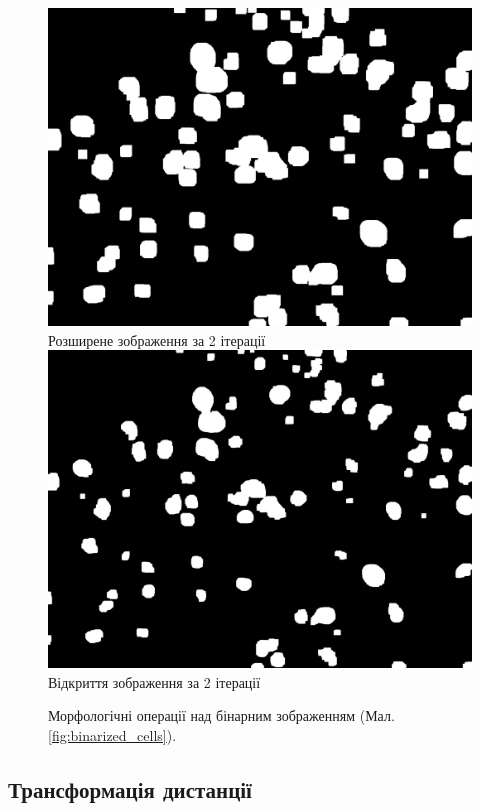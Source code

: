 \begin{figure}[b!]
	\centering	
	\includegraphics[width=0.95\linewidth]{Figures/Chapter2/3a.png}
	Розширене зображення за 2 ітерації
	\endminipage\hfill
	\centering	
	\includegraphics[width=0.95\linewidth]{Figures/Chapter2/3b.png}
	Відкриття зображення за 2 ітерації
	\endminipage\hfill
	
	\caption{Морфологічні операції над бінарним зображенням (Мал. \ref{fig:binarized_cells}).}
	\label{fig:morph_cells}
\end{figure}


\subsection{Трансформація дистанції}

